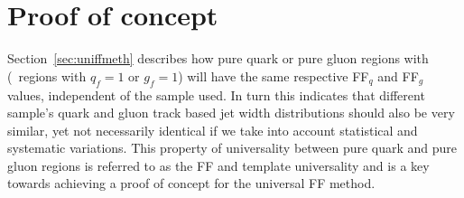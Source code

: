 	\section{Proof of concept}
		\label{sec:mctemp}
		Section~\ref{sec:uniffmeth} describes how pure quark or pure gluon regions with (\ie\ regions with $q_f=1$ or $g_f=1$) will have the same respective FF$_q$ and FF$_g$ values, independent of the sample used.  
	In turn this indicates that different sample's quark and gluon track based jet width distributions should also be very similar, yet not necessarily identical if we take into account statistical and systematic variations.
	 This property of universality between pure quark and pure gluon regions is referred to as the \ac{FF} and template universality and is a key towards achieving a proof of concept for the universal \ac{FF} method. 
